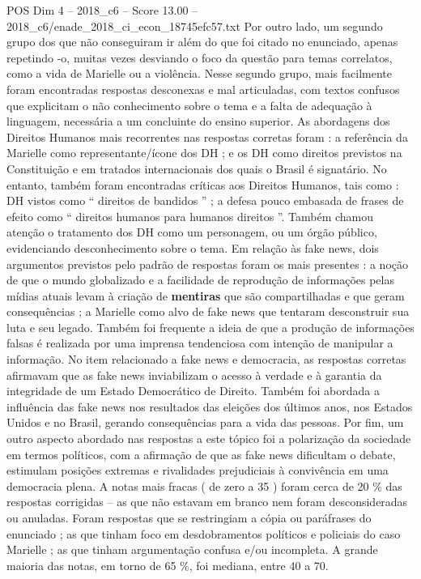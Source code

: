 \begin{textsample}{POS Dim 4 – 2018\_c6 – Score 13.00 – 2018\_c6/enade\_2018\_ci\_econ\_18745efc57.txt}
Por outro lado, um segundo grupo dos que não conseguiram ir além do que foi citado no enunciado, apenas repetindo -o, muitas vezes desviando o foco da questão para temas correlatos, como a vida de Marielle ou a violência.
Nesse segundo grupo, mais facilmente foram encontradas respostas desconexas e mal articuladas, com textos confusos que explicitam o não conhecimento sobre o tema e a falta de adequação à linguagem, necessária a um concluinte do ensino superior.
As abordagens dos Direitos Humanos mais recorrentes nas respostas corretas foram : a referência da Marielle como representante/ícone dos DH ; e os DH como direitos previstos na Constituição e em tratados internacionais dos quais o Brasil é signatário.
No entanto, também foram encontradas críticas aos Direitos Humanos, tais como : DH vistos como “ direitos de bandidos ” ; a defesa pouco embasada de frases de efeito como “ direitos humanos para humanos direitos ”.
Também chamou atenção o tratamento dos DH como um personagem, ou um órgão público, evidenciando desconhecimento sobre o tema.
Em relação às fake news, dois argumentos previstos pelo padrão de respostas foram os mais presentes : a noção de que o mundo globalizado e a facilidade de reprodução de informações pelas mídias atuais levam à criação de \textbf{mentiras} que são compartilhadas e que geram consequências ; a Marielle como alvo de fake news que tentaram desconstruir sua luta e seu legado.
Também foi frequente a ideia de que a produção de informações falsas é realizada por uma imprensa tendenciosa com intenção de manipular a informação.
No item relacionado a fake news e democracia, as respostas corretas afirmavam que as fake news inviabilizam o acesso à verdade e à garantia da integridade de um Estado Democrático de Direito.
Também foi abordada a influência das fake news nos resultados das eleições dos últimos anos, nos Estados Unidos e no Brasil, gerando consequências para a vida das pessoas.
Por fim, um outro aspecto abordado nas respostas a este tópico foi a polarização da sociedade em termos políticos, com a afirmação de que as fake news dificultam o debate, estimulam posições extremas e rivalidades prejudiciais à convivência em uma democracia plena.
A notas mais fracas ( de zero a 35 ) foram cerca de 20 \% das respostas corrigidas – as que não estavam em branco nem foram desconsideradas ou anuladas.
Foram respostas que se restringiam a cópia ou paráfrases do enunciado ; as que tinham foco em desdobramentos políticos e policiais do caso Marielle ; as que tinham argumentação confusa e/ou incompleta.
A grande maioria das notas, em torno de 65 \%, foi mediana, entre 40 a 70.

\end{textsample}
